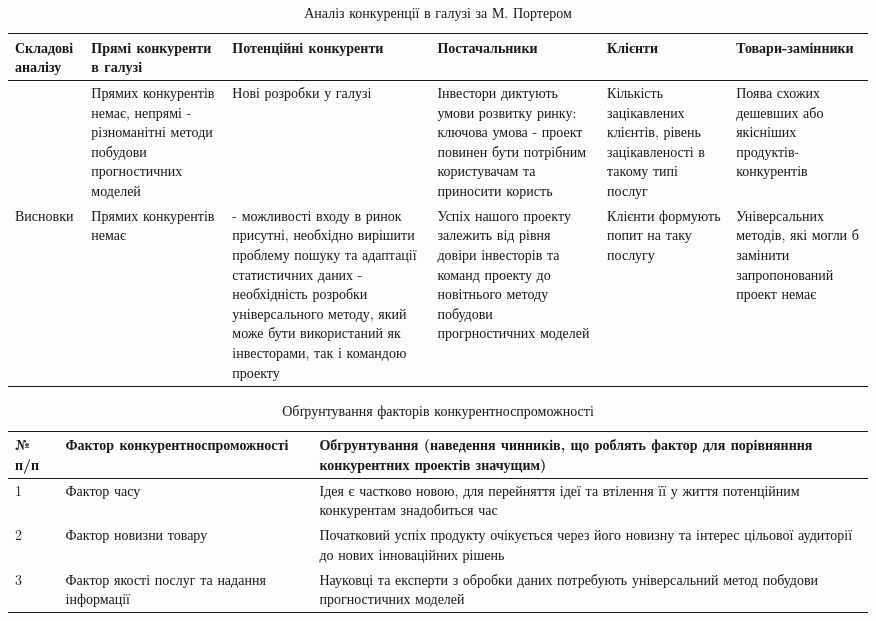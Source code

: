 \begin{table}[h!]
\fontsize{12pt}{12pt}\selectfont
	\begin{tabularx}{\textwidth}{|X|X|X|X|X|X|}
    \hline
    Складові аналізу & Прямі конкуренти в галузі & Потенційні конкуренти & Постачальники & Клієнти & Товари-замінники \\ \hline
     & Прямих конкурентів немає, непрямі - різноманітні методи побудови прогностичних моделей & Нові розробки у галузі & Інвестори диктують умови розвитку ринку: ключова умова - проект повинен бути потрібним користувачам та приносити користь & Кількість зацікавлених клієнтів, рівень зацікавленості в такому типі послуг & Поява схожих дешевших або якісніших продуктів-конкурентів \\ \hline
    Висновки & Прямих конкурентів немає & - можливості входу в ринок присутні, необхідно вирішити проблему пошуку та адаптації статистичних даних - необхідність розробки універсального методу, який може бути використаний як інвесторами, так і командою проекту & Успіх нашого проекту залежить від рівня довіри інвесторів та команд проекту до новітнього методу побудови прогрностичних моделей & Клієнти формують попит на таку послугу & Універсальних методів, які могли б замінити запропонований проект немає \\
    \hline
    \end{tabularx}
\caption{Аналіз конкуренції в галузі за М. Портером} \label{tab:stab_5}
\end{table}

\begin{table}[h!]
\fontsize{12pt}{12pt}\selectfont
	\begin{tabularx}{\textwidth}{|l|X|X|}
    \hline
    № п/п & Фактор конкурентноспроможності & Обгрунтування (наведення чинників, що роблять фактор для порівнянння конкурентних проектів значущим) \\ \hline
    1 & Фактор часу & Ідея є частково новою, для перейняття ідеї та втілення її у життя потенційним конкурентам знадобиться час \\ \hline
    2 & Фактор новизни товару & Початковий успіх продукту очікується через його новизну та інтерес цільової аудиторії до нових інноваційних рішень \\ \hline
    3 & Фактор якості послуг та надання інформації & Науковці та експерти з обробки даних потребують універсальний метод побудови прогностичних моделей \\
    \hline
    \end{tabularx}
\caption{Обґрунтування факторів конкурентноспроможності} \label{tab:stab_6}
\end{table}

